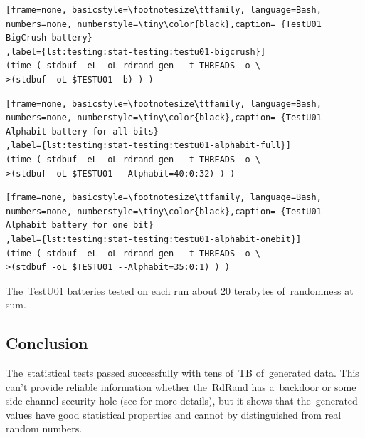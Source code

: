 \begin{lstlisting}[frame=none, basicstyle=\footnotesize\ttfamily, language=Bash, numbers=none, numberstyle=\tiny\color{black},caption= {TestU01 BigCrush battery}
,label={lst:testing:stat-testing:testu01-bigcrush}]
(time ( stdbuf -eL -oL rdrand-gen  -t THREADS -o \
>(stdbuf -oL $TESTU01 -b) ) )
\end{lstlisting}

\begin{lstlisting}[frame=none, basicstyle=\footnotesize\ttfamily, language=Bash, numbers=none, numberstyle=\tiny\color{black},caption= {TestU01 Alphabit battery for all bits}
,label={lst:testing:stat-testing:testu01-alphabit-full}]
(time ( stdbuf -eL -oL rdrand-gen  -t THREADS -o \
>(stdbuf -oL $TESTU01 --Alphabit=40:0:32) ) ) 
\end{lstlisting}

\begin{lstlisting}[frame=none, basicstyle=\footnotesize\ttfamily, language=Bash, numbers=none, numberstyle=\tiny\color{black},caption= {TestU01 Alphabit battery for one bit}
,label={lst:testing:stat-testing:testu01-alphabit-onebit}]
(time ( stdbuf -eL -oL rdrand-gen  -t THREADS -o \
>(stdbuf -oL $TESTU01 --Alphabit=35:0:1) ) ) 
\end{lstlisting}

\par{
The~TestU01 batteries tested on each run about 20 terabytes of~randomness at sum. 
}


\subsection{Conclusion}
\par{
The~statistical tests passed successfully with tens of~TB of~generated data. This can't provide reliable information whether the~RdRand has a~backdoor or some side-channel security hole (see  for more details), but it shows that the~generated values have good statistical properties and cannot by distinguished from real random numbers.
}


